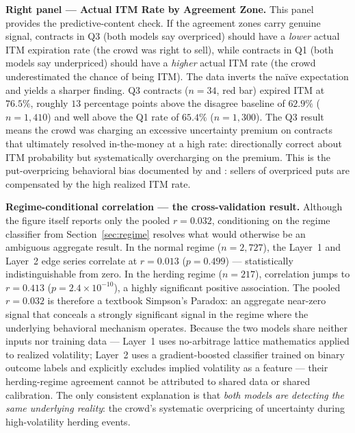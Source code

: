 \documentclass[12pt, letterpaper]{article}
\begin{document}
\textbf{Right panel --- Actual ITM Rate by Agreement Zone.} This
panel provides the predictive-content check. If the agreement zones
carry genuine signal, contracts in Q3 (both models say overpriced)
should have a \textit{lower} actual ITM expiration rate (the crowd
was right to sell), while contracts in Q1 (both models say
underpriced) should have a \textit{higher} actual ITM rate (the
crowd underestimated the chance of being ITM). The data inverts the
naïve expectation and yields a sharper finding. Q3 contracts ($n=34$,
red bar) expired ITM at $76.5\%$, roughly $13$ percentage points
above the disagree baseline of $62.9\%$ ($n=1{,}410$) and well
above the Q1 rate of $65.4\%$ ($n=1{,}300$). The Q3 result means
the crowd was charging an excessive uncertainty premium on contracts
that ultimately resolved in-the-money at a high rate: directionally
correct about ITM probability but systematically overcharging on
the premium. This is the put-overpricing behavioral bias documented
by \citet{Jackwerth1996} and \citet{Thaler1988}: sellers of
overpriced puts are compensated by the high realized ITM rate.

\newpage
\textbf{Regime-conditional correlation --- the cross-validation
result.} Although the figure itself reports only the pooled
$r = 0.032$, conditioning on the regime classifier from
Section~\ref{sec:regime} resolves what would otherwise be an
ambiguous aggregate result. In the normal regime ($n = 2{,}727$),
the Layer~1 and Layer~2 edge series correlate at $r = 0.013$
($p = 0.499$) --- statistically indistinguishable from zero. In the
herding regime ($n = 217$), correlation jumps to $r = 0.413$
($p = 2.4 \times 10^{-10}$), a highly significant positive
association. The pooled $r = 0.032$ is therefore a textbook
Simpson's Paradox: an aggregate near-zero signal that conceals a
strongly significant signal in the regime where the underlying
behavioral mechanism operates. Because the two models share neither
inputs nor training data --- Layer~1 uses no-arbitrage lattice
mathematics applied to realized volatility; Layer~2 uses a
gradient-boosted classifier trained on binary outcome labels and
explicitly excludes implied volatility as a feature --- their
herding-regime agreement cannot be attributed to shared data or
shared calibration. The only consistent explanation is that
\textit{both models are detecting the same underlying reality}: the
crowd's systematic overpricing of uncertainty during high-volatility
herding events.
\end{document}
